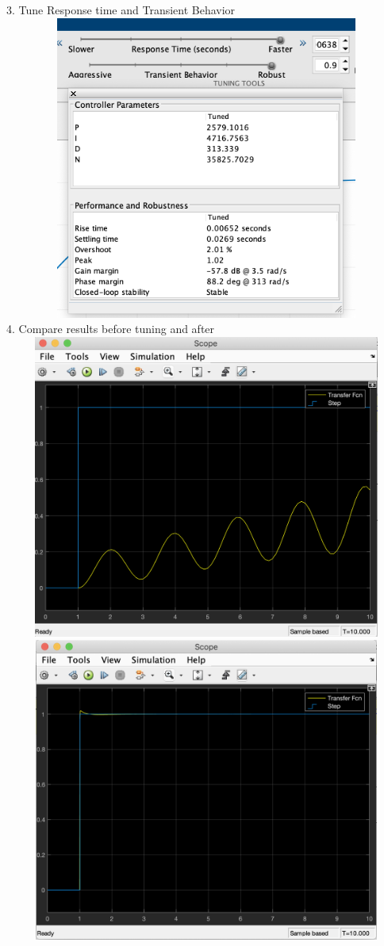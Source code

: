 \documentclass[a4paper,11pt]{article}
\theoremstyle{mytheor}
\begin{document}
$$$$
3. Tune Response time and Transient Behavior
$$$$
\includegraphics[width=15.5cm, height=10cm]{after_tuning_pid.png}
$$$$
4. Compare results before tuning and after
$$$$
\includegraphics[width=15.5cm, height=10cm]{initial_without_pid.png}
$$$$
\includegraphics[width=15.5cm, height=10cm]{final_results_pid.png}
\end{document}
